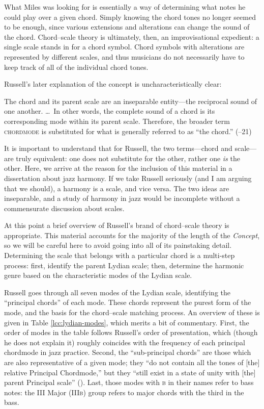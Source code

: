 What Miles was looking for is essentially a way of determining
what notes he could play over a given chord. Simply knowing the chord tones
no longer seemed to be enough, since various extensions and alterations can
change the sound of the chord. Chord--scale theory is ultimately, then, an
improvisational expedient: a single scale stands in for a chord symbol.
Chord symbols with alterations are represented by different scales, and thus
musicians do not necessarily have to keep track of all of the individual chord
tones.

Russell's later explanation of the concept is uncharacteristically clear:%
\begin{quoting}
  \singlespacing \vspace{-0.5em}
  The chord and its parent scale are an inseparable entity---the reciprocal
  sound of one another. \ldots\ In other words, the complete sound of a chord is
  its corresponding mode within its parent scale. Therefore, the broader term
  \textsc{chordmode} is substituted for what is generally referred to as ``the
  chord.'' (--21)
\end{quoting}
%
\noindent It is important to understand that for Russell, the two
terms---chord and scale---are truly equivalent: one does not substitute for
the other, rather one \emph{is} the other. Here, we arrive at the reason for
the inclusion of this material in a dissertation about jazz harmony. If we
take Russell seriously (and I am arguing that we should), a harmony is a scale,
and vice versa. The two ideas are inseparable, and a study of harmony in jazz
would be incomplete without a commensurate discussion about scales.

At this point a brief overview of Russell's brand of chord--scale theory is
appropriate. This material accounts for the majority of the length of the
\emph{Concept}, so we will be careful here to avoid going into all of its
painstaking detail. Determining the scale that belongs with a particular chord
is a multi-step process: first, identify the parent Lydian scale; then,
determine the harmonic genre based on the characteristic modes of the Lydian
scale.

Russell goes through all seven modes of the Lydian scale, identifying the
``principal chords'' of each mode. These chords represent the purest form of
the mode, and the basis for the chord--scale matching process. An overview of
these is given in Table \ref{lcc:lydian-modes}, which merits a bit of
commentary. First, the order of modes in the table follows
Russell's order of presentation, which (though he does not explain it)
roughly coincides with the frequency of each principal chordmode in jazz practice.
Second, the ``sub-principal chords'' are those which are also representative
of a given mode; they ``do not contain all the tones of [the] relative
Principal Chordmode,'' but they ``still exist in a state of unity with [the]
parent Principal scale'' (). Last, those modes with \textsc{b} in their
names refer to bass notes: the III Major (III\textsc{b}) group refers to major
chords with the third in the bass.

